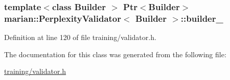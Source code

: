 \subsubsection[{\texorpdfstring{builder\+\_\+}{builder_}}]{\setlength{\rightskip}{0pt plus 5cm}template$<$class Builder $>$ {\bf Ptr}$<$Builder$>$ {\bf marian\+::\+Perplexity\+Validator}$<$ Builder $>$\+::builder\+\_\+\hspace{0.3cm}{\ttfamily [private]}}\hypertarget{classmarian_1_1PerplexityValidator_accdabbe55459e8f2c90c6575a6b9c8d2}{}\label{classmarian_1_1PerplexityValidator_accdabbe55459e8f2c90c6575a6b9c8d2}


Definition at line 120 of file training/validator.\+h.



The documentation for this class was generated from the following file\+:\begin{DoxyCompactItemize}
\item 
\hyperlink{training_2validator_8h}{training/validator.\+h}\end{DoxyCompactItemize}
